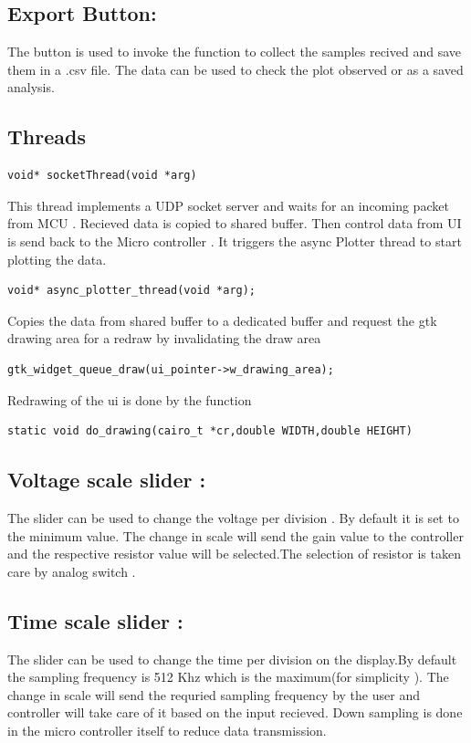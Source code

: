\documentclass{article}
\begin{document}
	\subsection{Export Button:}
	The button is used to invoke the function to collect the samples recived and save them in a .csv file.
	The data can be used to check the plot observed or as a saved analysis.
	
	\subsection{Threads}
	\begin{lstlisting}[style=CStyle]
	void* socketThread(void *arg)
	\end{lstlisting}
	This thread implements a UDP socket server and waits for an incoming packet from MCU . Recieved data is copied to shared buffer. Then control data from UI is send back to the Micro controller . It triggers the async Plotter thread to start plotting the data. 
	\begin{lstlisting}[style=CStyle] 
	void* async_plotter_thread(void *arg);
	\end{lstlisting}
	Copies the data from shared buffer to a dedicated buffer and request the gtk drawing area for a redraw by invalidating the draw area
	\begin{lstlisting}[style=CStyle]
	gtk_widget_queue_draw(ui_pointer->w_drawing_area);
	\end{lstlisting}
	Redrawing of the ui is done by the function
	\begin{lstlisting}[style=CStyle]
	static void do_drawing(cairo_t *cr,double WIDTH,double HEIGHT)
	\end{lstlisting}
	
	\subsection{Voltage scale slider :}
	
	The slider can be used to change the voltage per division . By default it is set to the minimum value. The change in scale will send the gain value to the controller and the respective resistor value will be selected.The selection of 
	resistor is taken care by analog switch .
	
	\subsection{Time scale slider :}
	
	The slider can be used to change the time per division on the display.By default the sampling frequency is 512 Khz which is the maximum(for simplicity ). The change in scale will send the requried sampling frequency by the user and controller will take care of it based on the input recieved. Down sampling is done in the micro controller itself to reduce data transmission.
	
\end{document}
